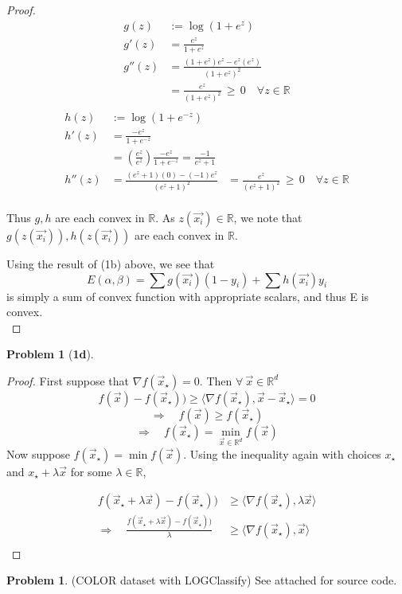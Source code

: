 \documentclass[10pt]{article}
\theoremstyle{plain}
\theoremstyle{definition}
\newtheorem{prob}{Problem}
\newtheorem*{prob*}{Problem}
\providecommand{\R}{\mathbb{R}}%
\numberwithin{equation}{section}
\begin{document}
\begin{proof}
  \[
  \begin{aligned}
    g(z)   &:= \log(1+e^{z}) \\
    g'(z)  &= \frac{e^{z}}{1+e^{z}} \\
    g''(z) &= \frac{ (1+e^{z}) e^{z} - e^{z} (e^{z}) }{(1+e^{z})^2} \\
           &= \frac{ e^{z} }{ (1+e^{z})^2 } \, \geq \, 0
                \quad \forall z \in \R \\
  \end{aligned}
  \]
  \[
  \begin{aligned}
    h(z)   &:= \log(1+e^{-z}) \\
    h'(z)   &= \frac{-e^{z}}{1+e^{-z}} \\
            &= \left(\frac{e^{z}}{e^{z}}\right) \frac{-e^{z}}{1+e^{-z}}
                  = \frac{-1}{e^{z} + 1 }\\
    h''(z)  &= \frac{(e^{z}+1)(0) - (-1)e^{z}}{(e^{z}+1)^2}
            &= \frac{e^{z}}{(e^{z}+1)^2} \, \geq \, 0
                \quad \forall z \in \R \\
  \end{aligned}
  \]

  Thus $g, h$ are each convex in $\R$.
  As $z(\vec{x_i}) \in \R$, we note that
  $g(z(\vec{x_i})), h(z(\vec{x_i}))$ are each convex in $\R$.

  Using the result of (1b) above, we see that
  \[
    E(\alpha, \beta) = \sum g(\vec{x_i}) (1 - y_i) + \sum h(\vec{x_i})y_i
  \]
  is simply a sum of convex function with appropriate scalars, and thus E is
  convex.\\

\end{proof}

\begin{prob*}[\bf{1d}]
\end{prob*}

\begin{proof}
First suppose that $\nabla f(\vec{x}_{\star}) = 0$.
Then $\forall \ \vec{x} \in \R^d$
\[
	f(\vec{x})-f(\vec{x}_{\star})) \geq
	\langle \nabla f(\vec{x}_{\star}) , \vec{x} - \vec{x}_{\star} \rangle
	= 0
	\]
	\[
	\Rightarrow \quad f(\vec{x}) \geq f(\vec{x}_{\star})
	\]
	\[
	\Rightarrow \quad f(\vec{x}_{\star}) = \min_{\vec{x} \in \R^d} f(\vec{x})
\]
Now suppose $f(\vec{x}_{\star}) = \min f(\vec{x})$. Using the inequality again with choices $x_{\star}$ and $x_{\star} + \lambda \vec{x}$ for some
$\lambda \in \R$,

\[
\begin{aligned}
f(\vec{x}_{\star} + \lambda \vec{x})-f(\vec{x}_{\star})) &\geq
\langle \nabla f(\vec{x}_{\star}) , \lambda \vec{x} \rangle \\
\Longrightarrow \quad
\frac{f(\vec{x}_{\star} + \lambda \vec{x})-f(\vec{x}_{\star}))}{\lambda} &\geq
\langle \nabla f(\vec{x}_{\star}) , \vec{x} \rangle \\
\end{aligned}
\]
\end{proof}
\clearpage
\begin{prob}
	(COLOR dataset with LOGClassify) See attached for source code.
\end{prob}
\end{document}
